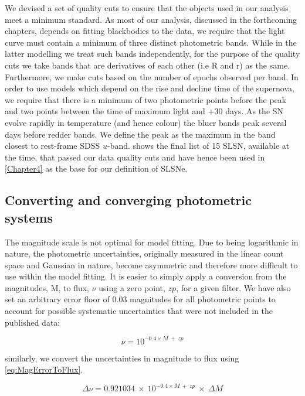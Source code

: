 We devised a set of quality cuts to ensure that the objects used in our analysis meet a minimum standard. As most of our analysis, discussed in the forthcoming chapters, depends on fitting blackbodies to the data, we require that the light curve must contain a minimum of three distinct photometric bands. While in the latter modelling we treat such bands independently, for the purpose of the quality cuts we take bands that are derivatives of each other (i.e R and r) as the same. Furthermore, we make cuts based on the number of epochs observed per band. In order to use models which depend on the rise and decline time of the supernova, we require that there is a minimum of two photometric points before the peak and two points between the time of maximum light and $+30$ days. As the SN evolve rapidly in temperature (and hence colour) the bluer bands peak several days before redder bands. We define the peak as the maximum in the band closest to rest-frame SDSS $u$-band.  shows the final list of 15 SLSN, available at the time, that passed our data quality cuts and have hence been used in \cref{Chapter4} as the base for our definition of SLSNe.

\subsection{Converting and converging photometric systems}
The magnitude scale is not optimal for model fitting. Due to being logarithmic in nature, the photometric uncertainties, originally measured in the linear count space and Gaussian in nature, become asymmetric and therefore more difficult to use within the model fitting. It is easier to simply apply a conversion from the magnitudes, M, to flux, $\nu$ using a zero point, $zp$, for a given filter. We have also set an arbitrary error floor of 0.03 magnitudes for all photometric points to account for possible systematic uncertainties that were not included in the published data:

\begin{equation}
\label{eq:MagToFlux}
\nu = 10^{-0.4 \times M~+~zp}
\end{equation}

\noindent similarly, we convert the uncertainties in magnitude to flux using \eqref{eq:MagErrorToFlux}.

\begin{equation}
\label{eq:MagErrorToFlux}
\Delta \nu = 0.921034~\times~10^{-0.4 \times M~+~zp}~\times~\Delta M
\end{equation}

